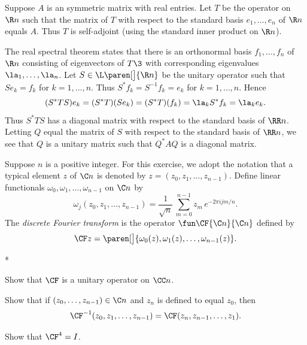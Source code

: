 \begin{Solution}
Suppose $A$ is an  symmetric matrix with real entries. Let $T$ be the operator on $\R n$ such that the matrix of $T$ with respect to the standard basis $e_1, \ldots, e_n$ of $\R n$ equals $A$. Thus $T$ is self-adjoint (using the standard inner product on $\R n$).

The real spectral theorem states that there is an orthonormal basis $f_1, \ldots, f_n$ of $\R n$ consisting of eigenvectors of $T\3$ with corresponding eigenvalues $\la_1, \ldots, \la_n$. Let $S \in \L\paren[\big]{\R n}$ be the unitary operator such that  $Se_k = f_k$ for
$k = 1, \ldots, n$. Thus $S^* f_k = S^{-1} f_k = e_k$ for $k = 1, \ldots, n$. Hence
\[
(S^* T S)e_k = (S^*T)(Se_k) = (S^*T)(f_k) = \la_k S^* f_k = \la_k e_k.
\]
Thus $S^* T S$ has a diagonal matrix with respect to the standard basis of $\RR n$. Letting $Q$ equal the matrix of $S$ with respect to the standard basis of $\RR n$, we see that $Q$ is a unitary matrix such that $Q^* A Q$ is a diagonal matrix.
\end{Solution}

\exercise
Suppose $n$ is a positive integer. For this exercise, we adopt the notation that a typical element $z$ of $\C n$ is denoted by
$z = (z_0, z_1, \ldots, z_{n-1})$. Define linear functionals $\omega_0, \omega_1, \ldots, \omega_{n-1}$ on $\C n$ by
\[
\omega_j(z_0, z_1, \ldots, z_{n-1}) = \frac{1}{\sqrt{n}} \, \sum_{m=0}^{n-1} z_m \,e^{-2\pi i j m/n}.
\]
The \emph{discrete Fourier transform} is the operator $\fun \CF {\C n} {\C n}$ defined by
\[
\CF z = \paren[\big]{ \omega_0(z), \omega_1(z), \ldots, \omega_{n-1}(z) }.
\]
\begin{subtheorem}*
\item
Show that $\CF$ is a unitary operator on $\CC n$.
\item
Show that if $(z_0, \ldots, z_{n-1}) \in \C n$ and $z_n$ is defined to equal $z_0$, then
\[
\CF^{-1}(z_0, z_1, \ldots, z_{n-1}) = \CF(z_n, z_{n-1}, \ldots, z_1).
\]
\item
Show that $\CF^4 = I$.
\end{subtheorem}

